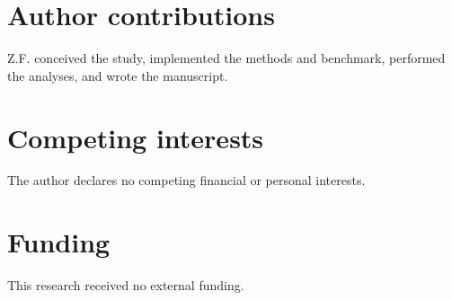 \documentclass[11pt]{article}
\begin{document}
\section*{Author contributions}
Z.F. conceived the study, implemented the methods and benchmark, performed the analyses, and wrote the
manuscript.

\section*{Competing interests}
The author declares no competing financial or personal interests.

\section*{Funding}
This research received no external funding.

\setlength{\bibsep}{0pt plus 0.2pt}


\end{document}
